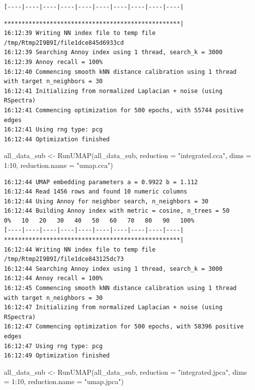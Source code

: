 \documentclass[
  letterpaper,
  DIV=11,
  numbers=noendperiod]{scrreprt}
\newenvironment{Shaded}{\begin{snugshade}}{\end{snugshade}}
\newcommand{\AttributeTok}[1]{\textcolor[rgb]{0.40,0.45,0.13}{#1}}
\newcommand{\DecValTok}[1]{\textcolor[rgb]{0.68,0.00,0.00}{#1}}
\newcommand{\FunctionTok}[1]{\textcolor[rgb]{0.28,0.35,0.67}{#1}}
\newcommand{\NormalTok}[1]{\textcolor[rgb]{0.00,0.23,0.31}{#1}}
\newcommand{\OtherTok}[1]{\textcolor[rgb]{0.00,0.23,0.31}{#1}}
\newcommand{\SpecialCharTok}[1]{\textcolor[rgb]{0.37,0.37,0.37}{#1}}
\newcommand{\StringTok}[1]{\textcolor[rgb]{0.13,0.47,0.30}{#1}}
\begin{document}
\begin{verbatim}
[----|----|----|----|----|----|----|----|----|----|
\end{verbatim}

\begin{verbatim}
**************************************************|
16:12:39 Writing NN index file to temp file /tmp/Rtmp2I9B9I/file1dce845d6933cd
16:12:39 Searching Annoy index using 1 thread, search_k = 3000
16:12:39 Annoy recall = 100%
16:12:40 Commencing smooth kNN distance calibration using 1 thread with target n_neighbors = 30
16:12:41 Initializing from normalized Laplacian + noise (using RSpectra)
16:12:41 Commencing optimization for 500 epochs, with 55744 positive edges
16:12:41 Using rng type: pcg
16:12:44 Optimization finished
\end{verbatim}

\begin{Shaded}
\begin{Highlighting}[]
\NormalTok{all\_data\_sub }\OtherTok{\textless{}{-}} \FunctionTok{RunUMAP}\NormalTok{(all\_data\_sub, }\AttributeTok{reduction =} \StringTok{"integrated.cca"}\NormalTok{, }\AttributeTok{dims =} \DecValTok{1}\SpecialCharTok{:}\DecValTok{10}\NormalTok{, }\AttributeTok{reduction.name =} \StringTok{"umap.cca"}\NormalTok{)}
\end{Highlighting}
\end{Shaded}

\begin{verbatim}
16:12:44 UMAP embedding parameters a = 0.9922 b = 1.112
16:12:44 Read 1456 rows and found 10 numeric columns
16:12:44 Using Annoy for neighbor search, n_neighbors = 30
16:12:44 Building Annoy index with metric = cosine, n_trees = 50
0%   10   20   30   40   50   60   70   80   90   100%
[----|----|----|----|----|----|----|----|----|----|
**************************************************|
16:12:44 Writing NN index file to temp file /tmp/Rtmp2I9B9I/file1dce843125dc73
16:12:44 Searching Annoy index using 1 thread, search_k = 3000
16:12:44 Annoy recall = 100%
16:12:45 Commencing smooth kNN distance calibration using 1 thread with target n_neighbors = 30
16:12:47 Initializing from normalized Laplacian + noise (using RSpectra)
16:12:47 Commencing optimization for 500 epochs, with 58396 positive edges
16:12:47 Using rng type: pcg
16:12:49 Optimization finished
\end{verbatim}

\begin{Shaded}
\begin{Highlighting}[]
\NormalTok{all\_data\_sub }\OtherTok{\textless{}{-}} \FunctionTok{RunUMAP}\NormalTok{(all\_data\_sub, }\AttributeTok{reduction =} \StringTok{"integrated.jpca"}\NormalTok{, }\AttributeTok{dims =} \DecValTok{1}\SpecialCharTok{:}\DecValTok{10}\NormalTok{, }\AttributeTok{reduction.name =} \StringTok{"umap.jpca"}\NormalTok{)}
\end{Highlighting}
\end{Shaded}
\end{document}
